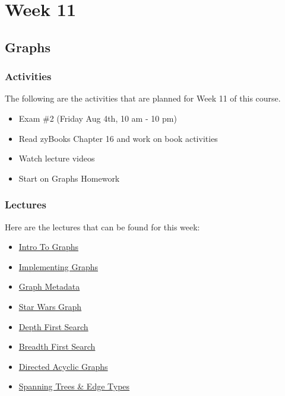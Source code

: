 \clearpage

\chapter{Week 11}

\section{Graphs}

\horizontalline

\subsection{Activities}

The following are the activities that are planned for Week 11 of this course.

\begin{itemize}
    \item Exam \#2 (Friday Aug 4th, 10 am - 10 pm)
    \item Read zyBooks Chapter 16 and work on book activities
    \item Watch lecture videos
    \item Start on Graphs Homework
\end{itemize}

\subsection{Lectures}

Here are the lectures that can be found for this week:

\begin{itemize}
    \item \href{https://applied.cs.colorado.edu/mod/hvp/view.php?id=46043}{Intro To Graphs}
    \item \href{https://applied.cs.colorado.edu/mod/hvp/view.php?id=46044}{Implementing Graphs}
    \item \href{https://applied.cs.colorado.edu/mod/hvp/view.php?id=46045}{Graph Metadata}
    \item \href{https://applied.cs.colorado.edu/mod/hvp/view.php?id=46046}{Star Wars Graph}
    \item \href{https://applied.cs.colorado.edu/mod/hvp/view.php?id=46047}{Depth First Search}
    \item \href{https://applied.cs.colorado.edu/mod/hvp/view.php?id=46048}{Breadth First Search}
    \item \href{https://applied.cs.colorado.edu/mod/hvp/view.php?id=46049}{Directed Acyclic Graphs}
    \item \href{https://applied.cs.colorado.edu/mod/hvp/view.php?id=46050}{Spanning Trees \& Edge Types}
\end{itemize}

